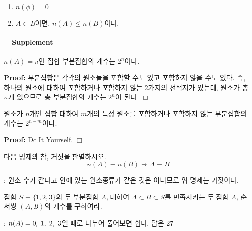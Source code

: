 \documentclass[paper=a4, fontsize=11pt]{scrartcl} %
\numberwithin{equation}{section} %
\numberwithin{figure}{section} %
\numberwithin{table}{section} %
\theoremstyle{plain}
\renewcommand{\qed}{\hfill $\Box$}
\renewenvironment{proof}{\par{\bf Proof:}}{\qed \par}
\newcommand{\Com}{,\Hs}
\newcommand{\Hs}{\hspace{0.1cm}}
\newcommand{\Vs}{\vspace{0.1cm}}
\newcommand{\VS}{\vspace{0.3cm}}
\newcommand{\BKS}[1]{\left( #1 \right)}
\newcommand{\Nb}[1][A]{n(#1)}
\newcommand{\A}{$A$}
\newcommand{\B}{$B$}
\begin{document}
\begin{thm}
 \begin{enumerate}
  \item $\Nb[\phi] = 0$
  \item $A \subset B$이면, $\Nb \leq \Nb[B]$이다.
 \end{enumerate}

\end{thm}

\pagebreak

\paragraph{$-$ Supplement}

\begin{thm}
 $\Nb = n$인 집합  부분집합의 개수는 $2^n$이다.
\end{thm}

\begin{proof}
  부분집합은  각각의 원소들을 포함할 수도 있고 포함하지 않을 수도 있다. 즉, 하나의 원소에 대하여 포함하거나 포함하지 않는 2가지의 선택지가
 있는데, 원소가 총 $n$개 있으므로 총 부분집합의 개수는 $2^n$이 된다.
\end{proof}

\Vs

\begin{cor}
 원소가 $n$개인 집합  대하여 $m$개의 특정 원소를 포함하거나 포함하지 않는 부분집합의 개수는 $2^{n-m}$이다. 
\end{cor}
\begin{proof}
 Do It Yourself.
\end{proof}

\VS

\begin{exmp}
다음 명제의 참, 거짓을 판별하시오.
\begin{equation*}
 \Nb = \Nb[B] \Rightarrow A=B
\end{equation*}

\VS

\textnormal{: 원소 수가 같다고 안에 있는 원소종류가 같은 것은 아니므로 위 명제는 거짓이다.} 
\end{exmp}

\VS

\begin{exmp}
 집합 $S = \{1,2,3\}$의 두 부분집합 \A,  대하여 $A\subset B\subset S$를 만족시키는 두 집합 \A,  순서쌍 $\BKS{A,B}$의 개수를 구하여라.
 \VS
 
 \textnormal{: $n(A)=0\Com 1\Com 2\Com 3$일 때로 나누어 풀어보면 쉽다. 답은 27}
\end{exmp}










\end{document}
